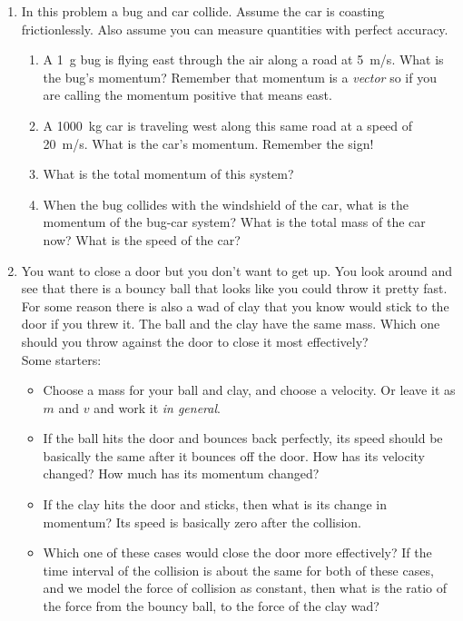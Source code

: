 \documentclass[letterpaper,12pt]{article}
\let\olditem\item
\renewcommand{\item}{\Needspace{6\baselineskip}\olditem}
\renewcommand{\bigskip}{\needspace{1in}\vspace{1in}}
\begin{document}
\begin{enumerate}
	\setlength\itemsep{1 in}
	
	\item In this problem a bug and car collide. Assume the car is coasting frictionlessly. Also assume you can measure quantities with perfect accuracy. 
	\begin{enumerate}
		\item A \SI{1}{\gram} bug is flying east through the air along a road at \SI{5}{m/s}. What is the bug's momentum? Remember that momentum is a \emph{vector} so if you are calling the momentum positive that means east.
		\item A \SI{1000}{kg} car is traveling west along this same road at a speed of \SI{20}{m/s}. What is the car's momentum. Remember the sign!
		\item What is the total momentum of this system?
		\item When the bug collides with the windshield of the car, what is the momentum of the bug-car system? What is the total mass of the car now? What is the speed of the car?
	\end{enumerate}
	
	
	
	\item You want to close a door but you don't want to get up. You look around and see that there is a bouncy ball that looks like you could throw it pretty fast. For some reason there is also a wad of clay that you know would stick to the door if you threw it. The ball and the clay have the same mass. Which one should you throw against the door to close it most effectively?\\
	Some starters:
	\begin{itemize}
		\item Choose a mass for your ball and clay, and choose a velocity. Or leave it as $m$ and $v$ and work it \emph{in general}.
		\item If the ball hits the door and bounces back perfectly, its speed should be basically the same after it bounces off the door. How has its velocity changed? How much has its momentum changed?\bigskip
		\item If the clay hits the door and sticks, then what is its change in momentum? Its speed is basically zero after the collision.\bigskip
		\item Which one of these cases would close the door more effectively? If the time interval of the collision is about the same for both of these cases, and we model the force of collision as constant, then what is the ratio of the force from the bouncy ball, to the force of the clay wad?
	\end{itemize}
	

\end{enumerate}
\end{document}
